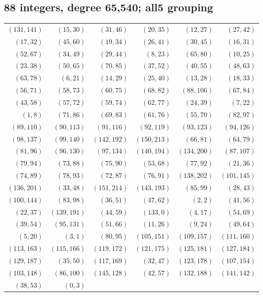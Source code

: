 \subsection*{88 integers, degree 65,540; all5 grouping}
\begingroup\small
\begin{longtable}{rrrrrr}
$(131,141)$ & $(15,30)$ & $(31,46)$ & $(20,35)$ & $(12,27)$ & $(27,42)$\\
$(17,32)$ & $(45,60)$ & $(19,34)$ & $(26,41)$ & $(30,45)$ & $(16,31)$\\
$(52,67)$ & $(34,49)$ & $(29,44)$ & $(8,23)$ & $(65,80)$ & $(10,25)$\\
$(23,38)$ & $(50,65)$ & $(70,85)$ & $(37,52)$ & $(40,55)$ & $(48,63)$\\
$(63,78)$ & $(6,21)$ & $(14,29)$ & $(25,40)$ & $(13,28)$ & $(18,33)$\\
$(56,71)$ & $(58,73)$ & $(60,75)$ & $(68,82)$ & $(88,106)$ & $(67,84)$\\
$(43,58)$ & $(57,72)$ & $(59,74)$ & $(62,77)$ & $(24,39)$ & $(7,22)$\\
$(1,8)$ & $(71,86)$ & $(69,83)$ & $(61,76)$ & $(55,70)$ & $(82,97)$\\
$(89,110)$ & $(90,113)$ & $(91,116)$ & $(92,119)$ & $(93,123)$ & $(94,126)$\\
$(98,137)$ & $(99,140)$ & $(142,192)$ & $(150,213)$ & $(66,81)$ & $(64,79)$\\
$(81,96)$ & $(96,130)$ & $(97,134)$ & $(140,194)$ & $(134,200)$ & $(87,107)$\\
$(79,94)$ & $(73,88)$ & $(75,90)$ & $(53,68)$ & $(77,92)$ & $(21,36)$\\
$(74,89)$ & $(78,93)$ & $(72,87)$ & $(76,91)$ & $(138,202)$ & $(101,145)$\\
$(136,201)$ & $(33,48)$ & $(151,214)$ & $(143,193)$ & $(85,99)$ & $(28,43)$\\
$(100,144)$ & $(83,98)$ & $(36,51)$ & $(47,62)$ & $(2,2)$ & $(41,56)$\\
$(22,37)$ & $(139,191)$ & $(44,59)$ & $(133,0)$ & $(4,17)$ & $(54,69)$\\
$(39,54)$ & $(95,131)$ & $(51,66)$ & $(11,26)$ & $(9,24)$ & $(49,64)$\\
$(5,20)$ & $(3,1)$ & $(80,95)$ & $(105,151)$ & $(109,157)$ & $(111,160)$\\
$(113,163)$ & $(115,166)$ & $(119,172)$ & $(121,175)$ & $(125,181)$ & $(127,184)$\\
$(129,187)$ & $(35,50)$ & $(117,169)$ & $(32,47)$ & $(123,178)$ & $(107,154)$\\
$(103,148)$ & $(86,100)$ & $(145,128)$ & $(42,57)$ & $(132,188)$ & $(141,142)$\\
$(38,53)$ & $(0,3)$ & & & &\\
\end{longtable}
\endgroup
